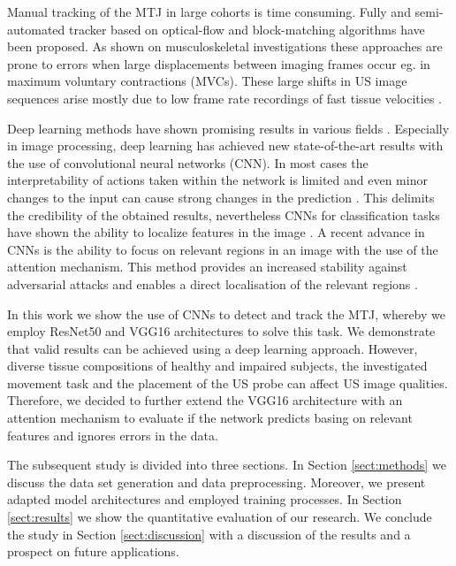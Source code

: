 \documentclass[letterpaper, 10 pt, conference]{ieeeconf}
\begin{document}
Manual tracking of the MTJ in large cohorts is time consuming. Fully and semi-automated tracker based on optical-flow and block-matching algorithms have been proposed. As shown on musculoskeletal investigations these approaches are prone to errors \cite{j:Cronin2011} when large displacements between imaging frames occur eg. in maximum voluntary contractions (MVCs). These large shifts in US image sequences arise mostly due to low frame rate recordings of fast tissue velocities \cite{j:Leitner2019}.

Deep learning methods have shown promising results in various fields \cite{lecun2015deep}. Especially in image processing, deep learning has achieved new state-of-the-art results with the use of convolutional neural networks (CNN). In most cases the interpretability of actions taken within the network is limited and even minor changes to the input can cause strong changes in the prediction \cite{adversarial_examples}. This delimits the credibility of the obtained results, nevertheless CNNs for classification tasks have shown the ability to localize features in the image \cite{discriminative_localization}. A recent advance in CNNs is the ability to focus on relevant regions in an image with the use of the attention mechanism. This method provides an increased stability against adversarial attacks and enables a direct localisation of the relevant regions \cite{Attention}.

In this work we show the use of CNNs to detect and track the MTJ, whereby we employ ResNet50 \cite{ResNet} and VGG16 \cite{VGG} architectures to solve this task. We demonstrate that valid results can be achieved using a deep learning approach. However, diverse tissue compositions of healthy and impaired subjects, the investigated movement task and the placement of the US probe can affect US image qualities. Therefore, we decided to further extend the VGG16 architecture with an attention mechanism \cite{Attention} to evaluate if the network predicts basing on relevant features and ignores errors in the data.

The subsequent study is divided into three sections. In Section \ref{sect:methods} we discuss the data set generation and data preprocessing. Moreover, we present adapted model architectures and employed training processes. In Section \ref{sect:results} we show the quantitative evaluation of our research. We conclude the study in Section \ref{sect:discussion} with a discussion of the results and a prospect on future applications.
\end{document}
